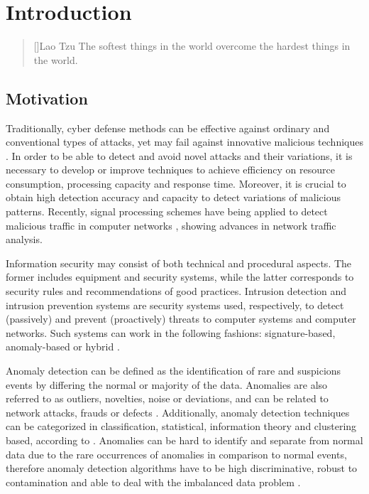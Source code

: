 \chapter{Introduction}
\label{ch:1_introduction}

\begin{quotation}[]{Lao Tzu}
The softest things in the world overcome the hardest things in the world.
\end{quotation}


\section{Motivation}
\label{sc:motivation}

Traditionally, cyber defense methods can be effective against ordinary and conventional types of attacks, yet may fail against innovative malicious techniques \cite{lakhina2005mining}. In order to be able to detect and avoid novel attacks and their variations, it is necessary to develop or improve techniques to achieve efficiency on resource consumption, processing capacity and response time. Moreover, it is crucial to obtain high detection accuracy and capacity to detect variations of malicious patterns. Recently, signal processing schemes have being applied to detect malicious traffic in computer networks \cite{Lu2009,Huang2009,Zonglin2009,david2011blind,da2012improved,tenorio2013greatest, vieira2017model}, showing advances in network traffic analysis.

Information security may consist of both technical and procedural aspects. The former includes equipment and security systems, while the latter corresponds to security rules and recommendations of good practices. Intrusion detection and intrusion prevention systems are security systems used, respectively, to detect (passively) and prevent (proactively) threats to computer systems and computer networks. Such systems can work in the following fashions: signature-based, anomaly-based or hybrid \cite{Huang2009,mudzingwa2012study}.

Anomaly detection can be defined as the identification of rare and suspicions events by differing the normal or majority of the data. Anomalies are also referred to as outliers, novelties, noise or deviations, and can be related to network attacks, frauds or defects \cite{bhuyan2014network,ahmed2016survey}. Additionally, anomaly detection techniques can be categorized in classification, statistical, information theory and clustering based, according to \cite{bhuyan2014network,ahmed2016survey,osanaiye2016distributed}. Anomalies can be hard to identify and separate from normal data due to the rare occurrences of anomalies in comparison to normal events, therefore anomaly detection algorithms have to be high discriminative, robust to contamination and able to deal with the imbalanced data problem \cite{he2008learning}.

